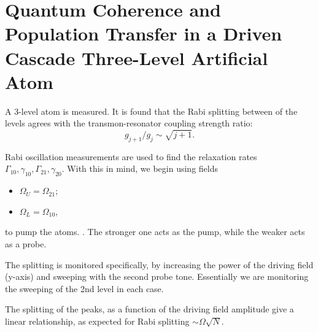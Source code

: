\section{Quantum Coherence and Population Transfer in a Driven Cascade Three-Level Artificial Atom}
  A 3-level atom is measured. It is found that the Rabi splitting between of the levels agrees with the transmon-resonator coupling strength ratio:
  \[
  	g_{j+1}/g_j \sim \sqrt{j+1}.
  \]
 
 
 Rabi oscillation measurements are used to find the relaxation rates $ \Gamma_{10}, \gamma_{10}, \Gamma_{21}, \gamma_{20}$. With this in mind, we begin using fields
 
 \begin{itemize}
 	\item $ \Omega_U = \Omega_{21} $;
 	\item $ \Omega_L  = \Omega_{10}$,
 \end{itemize}

\noindent to pump the atoms. . The stronger one acts as the pump, while the weaker acts as a probe.

 
 The splitting is monitored specifically, by increasing the power of the driving field (y-axis) and sweeping with the second probe tone. Essentially we are monitoring the sweeping of the 2nd level in each case. \textbf{}
 
 
 The splitting of the peaks, as a function of the driving field amplitude give a linear relationship, as expected for Rabi splitting $ \sim \Omega\sqrt{N} $.
 
 
 \newpage
 